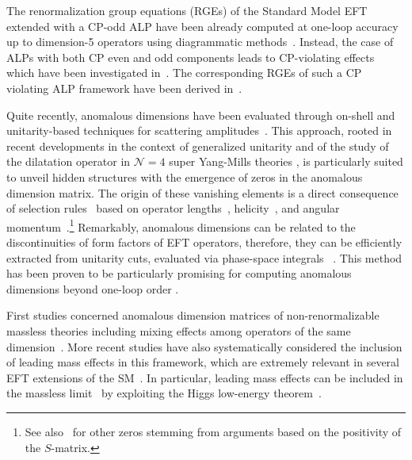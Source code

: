 The renormalization group equations (RGEs) of the Standard Model EFT extended with a CP-odd ALP have been already computed at one-loop accuracy up to dimension-5 operators using diagrammatic methods~\cite{Bauer:2020jbp,Chala:2020wvs}. 
Instead, the case of ALPs with both CP even and odd components leads to CP-violating effects which have
been investigated in~\cite{Marciano:2016yhf,DiLuzio:2020oah}.
The corresponding RGEs of such a CP violating ALP framework
have been derived in~\cite{DasBakshi:2023lca}. 

Quite recently, anomalous dimensions have been evaluated  
through on-shell and unitarity-based techniques for scattering amplitudes~\cite{Caron-Huot:2016cwu,EliasMiro:2020tdv,Baratella:2020lzz,Jiang:2020mhe,Bern:2020ikv,Baratella:2020dvw,AccettulliHuber:2021uoa,EliasMiro:2021jgu,Baratella:2022nog,Machado:2022ozb}.
This approach, rooted in recent developments in the context of generalized unitarity \cite{Arkani-Hamed:2008owk, Huang:2012aq, Cheung:2015aba} and of the study of the dilatation operator in $\mathcal{N}=4$ super Yang-Mills theories \cite{Zwiebel:2011bx,Wilhelm:2014qua, Nandan:2014oga, Koster:2014fva, Brandhuber:2014pta, Brandhuber:2015boa, Loebbert:2015ova, Brandhuber:2016fni}, is particularly suited to unveil hidden structures with the emergence of zeros in the anomalous dimension matrix.
The origin of these vanishing elements is a direct consequence of selection rules~\cite{Elias-Miro:2014eia} based on operator lengths~\cite{Bern:2019wie}, helicity~\cite{Cheung:2015aba}, and angular momentum~\cite{Jiang:2020rwz}.\footnote{See also~\cite{Chala:2023jyx,Chala:2023xjy} for other zeros stemming from arguments based on the positivity of the $S$-matrix.}
%
Remarkably, anomalous dimensions can be 
related to the discontinuities of form factors of EFT operators,
therefore, they can be efficiently extracted from
unitarity cuts, evaluated via phase-space integrals ~\cite{Caron-Huot:2016cwu}.
This method has been proven to be
particularly promising for computing anomalous dimensions beyond one-loop order
\cite{Caron-Huot:2016cwu,Bern:2020ikv,EliasMiro:2021jgu}.

First studies concerned anomalous dimension matrices of non-renormalizable massless theories including mixing effects among operators of the same dimension~\cite{Caron-Huot:2016cwu}.
More recent studies have also systematically considered the inclusion of leading mass effects in this framework, which are extremely relevant in several EFT extensions of the SM~\cite{Bresciani:2023jsu}.
In particular, leading mass effects can be included in the massless limit~\cite{Bresciani:2023jsu} by exploiting the Higgs low-energy theorem~\cite{Ellis:1975ap,Shifman:1979eb,Shadmi:2018xan,Durieux:2019eor,Durieux:2020gip,Balkin:2021dko,Bertuzzo:2023slg}. 

